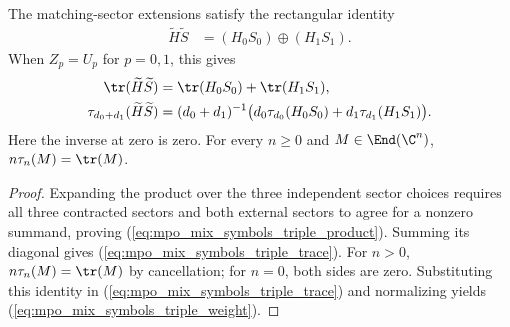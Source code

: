 \begin{lemma}
    \label{thm:mpo_mixed_triple_trace}
    \leanok
    The matching-sector extensions satisfy the rectangular identity
    \begin{align}
        \widetilde H\widetilde S
         & =(H_0S_0)\oplus(H_1S_1).
        \label{eq:mpo_mix_symbols_triple_product}
    \end{align}
    When $Z_p=U_p$ for $p=0,1$, this gives
    \begin{align}
        \tr(\widetilde H\widetilde S)
         & =\tr(H_0S_0)+\tr(H_1S_1),
        \label{eq:mpo_mix_symbols_triple_trace} \\
        \tau_{d_0+d_1}(\widetilde H\widetilde S)
         & =(d_0+d_1)^{-1}
        \bigl(d_0\tau_{d_0}(H_0S_0)+d_1\tau_{d_1}(H_1S_1)\bigr).
        \label{eq:mpo_mix_symbols_triple_weight}
    \end{align}
    Here the inverse at zero is zero. For every $n\geq0$ and
    $M\in\End(\C^n)$, $n\tau_n(M)=\tr(M)$.
\end{lemma}
\begin{proof}
    \leanok
    Expanding the product over the three independent sector choices
    requires all three contracted sectors and both external sectors to
    agree for a nonzero summand, proving
    (\ref{eq:mpo_mix_symbols_triple_product}). Summing its diagonal
    gives (\ref{eq:mpo_mix_symbols_triple_trace}). For $n>0$,
    $n\tau_n(M)=\tr(M)$ by cancellation; for $n=0$, both sides are
    zero. Substituting this identity in
    (\ref{eq:mpo_mix_symbols_triple_trace}) and normalizing yields
    (\ref{eq:mpo_mix_symbols_triple_weight}).
\end{proof}

